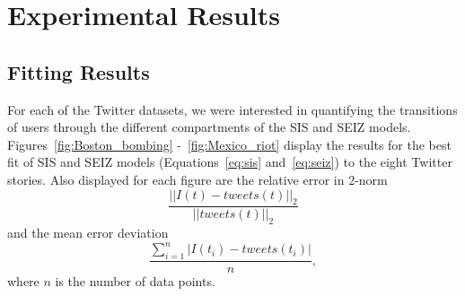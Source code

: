 \section{Experimental Results}
\subsection{Fitting Results}

For each of the Twitter datasets, we were interested in quantifying the transitions of users through the different compartments of the SIS and SEIZ models.
Figures~\ref{fig:Boston_bombing} -~\ref{fig:Mexico_riot} display the results for the best fit of SIS and SEIZ models (Equations~\ref{eq:sis} and~\ref{eq:seiz}) to the eight Twitter stories. Also displayed for each figure are the relative error in 2-norm $$\frac{||I(t) - tweets(t)||_2}{||tweets(t)||_2}$$ and the mean error deviation $$\frac{\sum_{i=1}^n|I(t_i)-tweets(t_i)|}{n},$$  where $n$ is the number of data points.




